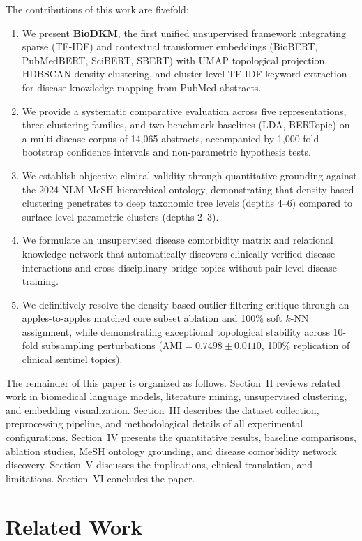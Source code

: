 \documentclass[a4paper,fleqn]{cas-dc}
\begin{document}
The contributions of this work are fivefold:
\begin{enumerate}
\item We present \textbf{BioDKM}, the first unified unsupervised framework integrating sparse (TF-IDF) and contextual transformer embeddings (BioBERT, PubMedBERT, SciBERT, SBERT) with UMAP topological projection, HDBSCAN density clustering, and cluster-level TF-IDF keyword extraction for disease knowledge mapping from PubMed abstracts.
\item We provide a systematic comparative evaluation across five representations, three clustering families, and two benchmark baselines (LDA, BERTopic) on a multi-disease corpus of 14,065 abstracts, accompanied by 1,000-fold bootstrap confidence intervals and non-parametric hypothesis tests.
\item We establish objective clinical validity through quantitative grounding against the 2024 NLM MeSH hierarchical ontology, demonstrating that density-based clustering penetrates to deep taxonomic tree levels (depths 4--6) compared to surface-level parametric clusters (depths 2--3).
\item We formulate an unsupervised disease comorbidity matrix and relational knowledge network that automatically discovers clinically verified disease interactions and cross-disciplinary bridge topics without pair-level disease training.
\item We definitively resolve the density-based outlier filtering critique through an apples-to-apples matched core subset ablation and 100\% soft $k$-NN assignment, while demonstrating exceptional topological stability across 10-fold subsampling perturbations ($\text{AMI} = 0.7498 \pm 0.0110$, 100\% replication of clinical sentinel topics).
\end{enumerate}

The remainder of this paper is organized as follows. Section~II reviews related work in biomedical language models, literature mining, unsupervised clustering, and embedding visualization. Section~III describes the dataset collection, preprocessing pipeline, and methodological details of all experimental configurations. Section~IV presents the quantitative results, baseline comparisons, ablation studies, MeSH ontology grounding, and disease comorbidity network discovery. Section~V discusses the implications, clinical translation, and limitations. Section~VI concludes the paper.

\section{Related Work}
\end{document}
